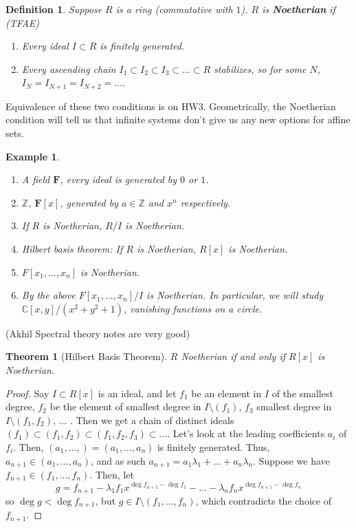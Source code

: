 \documentclass[12pt]{article}
\newcommand{\F}{\mathbf{F}}
\newcommand{\C}{\mathbb{C}}
\newcommand{\Z}{\mathbb{Z}}
\newtheorem{definition}{Definition}
\newtheorem{example}[]{Example}
\newtheorem{theorem}{Theorem}
\begin{document}
    \begin{definition}
        Suppose $R$ is a ring (commutative with $1$). $R$ is \textbf{Noetherian} if (TFAE)
        \begin{enumerate}
            \item Every ideal $I \subset R$ is finitely generated. 
            \item Every ascending chain $I_1 \subset I_2 \subset I_3 \subset \dots \subset R$ stabilizes, so for some $N$, $I_{N} = I_{N+1} = I_{N+2} = \dots$. 
        \end{enumerate} 
    \end{definition}
    Equivalence of these two conditions is on HW3. Geometrically, the Noetherian condition will tell us that infinite systems don't give us any new options for affine sets. \par 
    \begin{example}
        \begin{enumerate}
            \item A field $\F$, every ideal is generated by $0$ or $1$. 
            \item $\Z$, $\F[x]$, generated by $a \in \Z$ and $x^n$ respectively. 
            \item If $R$ is Noetherian, $R/I$ is Noetherian. 
            \item Hilbert basis theorem: If $R$ is Noetherian, $R[x]$ is Noetherian. 
            \item $F[x_1, \dots, x_n]$ is Noetherian. 
            \item By the above $F[x_1, \dots, x_n]/I$ is Noetherian. In particular, we will study $\C[x, y]/(x^2 + y^2 + 1)$, vanishing functions on a circle. 
        \end{enumerate}
    \end{example}
    (Akhil Spectral theory notes are very good)\par 
    \begin{theorem}
        [Hilbert Basis Theorem] $R$ Noetherian if and only if $R[x]$ is Noetherian. 
    \end{theorem}
    \begin{proof}
        Say $I \subset R[x]$ is an ideal, and let $f_1$ be an element in $I$ of the smallest degree, $f_2$ be the element of smallest degree in $I \setminus (f_1)$, $f_3$ smallest degree in $I \setminus (f_1, f_2)$, ... . Then we get a chain of distinct ideals $(f_1) \subset (f_1, f_2) \subset (f_1, f_2, f_3) \subset \dots$. Let's look at the leading coefficients $a_i$ of $f_i$. Then, $(a_1, \dots, ) = (a_1, \dots, a_n)$ is finitely generated. Thus, $a_{n+1} \in (a_1, \dots, a_n)$, and as such $a_{n+1} = a_1\lambda_1 + \dots + a_n\lambda_n$. Suppose we have $f_{n+1} \in (f_1, \dots, f_n)$. Then, let 
        $$g = f_{n+1} - \lambda_1 f_1 x^{\deg f_{n+1} - \deg f_1} - \dots - \lambda_n f_n x^{\deg f_{n+1} - \deg f_n}$$
        so $\deg g < \deg f_{n+1}$, but $g \in I \setminus (f_1, \dots, f_n)$, which contradicts the choice of $f_{n+1}$. 
    \end{proof}
\end{document}

